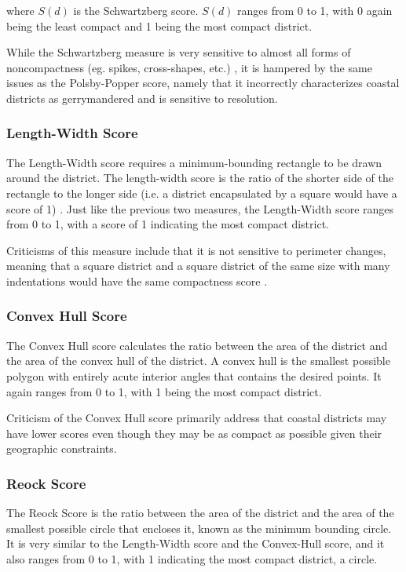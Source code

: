 where $S(d)$ is the Schwartzberg score. $S(d)$ ranges from 0 to 1, with 0 again being the least compact and 1 being the most compact district. 

While the Schwartzberg measure is very sensitive to almost all forms of noncompactness (eg. spikes, cross-shapes, etc.) \parencite[301]{polsby1991}, it is hampered by the same issues as the Polsby-Popper score, namely that it incorrectly characterizes coastal districts as gerrymandered and is sensitive to resolution. 

\subsubsection{Length-Width Score}

The Length-Width score requires a minimum-bounding rectangle to be drawn around the district. The length-width score is the ratio of the shorter side of the rectangle to the longer side (i.e. a district encapsulated by a square would have a score of 1) \parencite{harris1964}. Just like the previous two measures, the Length-Width score ranges from 0 to 1, with a score of 1 indicating the most compact district. 

Criticisms of this measure include that it is not sensitive to perimeter changes, meaning that a square district and a square district of the same size with many indentations would have the same compactness score \parencite{polsby1991}.

\subsubsection{Convex Hull Score}

The Convex Hull score calculates the ratio between the area of the district and the area of the convex hull of the district. A convex hull is the smallest possible polygon with entirely acute interior angles that contains the desired points. It again ranges from 0 to 1, with 1 being the most compact district. \parencite{maceachren1985}

Criticism of the Convex Hull score primarily address that coastal districts may have lower scores even though they may be as compact as possible given their geographic constraints.

\subsubsection{Reock Score}

The Reock Score is the ratio between the area of the district and the area of the smallest possible circle that encloses it, known as the minimum bounding circle. It is very similar to the Length-Width score and the Convex-Hull score, and it also ranges from 0 to 1, with 1 indicating the most compact district, a circle. \parencite{reock1961}

